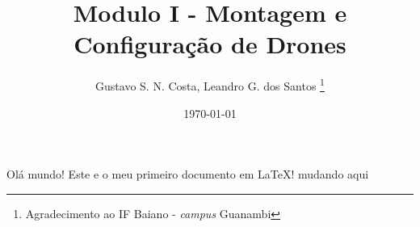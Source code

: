 \documentclass {article}
\title{Modulo I - \textbf{Montagem e Configuração de Drones}}
\author{Gustavo S. N. Costa, Leandro G. dos Santos \thanks{Agradecimento ao IF Baiano - \textit{campus} Guanambi}}
\date{\today}
\begin{document}
    \maketitle
    Olá mundo! Este e o meu primeiro documento em LaTeX! mudando aqui
\end{document}
